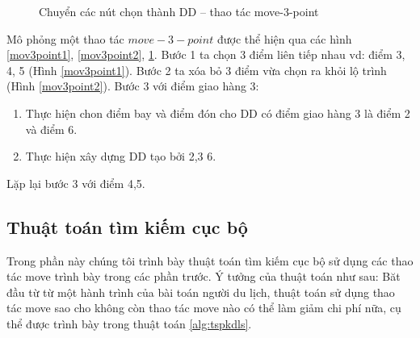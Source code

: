 \documentclass[a4paper,12pt]{report}
\begin{document}
\begin{figure}[H]

\caption{Chuyển các nút chọn thành DD -- thao tác move-3-point}\label{mov3point3}
\end{figure}

Mô phỏng một thao tác $move-3-point$ được thể hiện qua các hình \ref{mov3point1}, \ref{mov3point2}, \ref{mov3point3}. Bước 1 ta chọn 3 điểm liên tiếp nhau vd:  điểm 3, 4, 5 (Hình \ref{mov3point1}). Bước 2 ta xóa bỏ 3 điểm vừa chọn ra khỏi lộ trình (Hình \ref{mov3point2}). Bước 3 với điểm giao hàng 3:\begin{enumerate}
\item Thực hiện chon điểm bay và điểm đón cho DD có điểm giao hàng 3 là điểm 2 và điểm 6.
\item Thực hiện xây dựng DD tạo bởi 2,3 6.
\end{enumerate} 
Lặp lại bước 3 với điểm 4,5.
\subsection{Thuật toán tìm kiếm cục bộ}
\label{subsection:tspkdal}
Trong phần này chúng tôi trình bày thuật toán tìm kiếm cục bộ sử dụng các thao tác move trình bày trong các phần trước. Ý tưởng của thuật toán như sau: Băt đầu từ từ một hành trình của bài toán người du lịch, thuật toán sử dụng thao tác move sao cho không còn thao tác move nào có thể làm giảm chi phí nữa, cụ thể được trình bày trong thuật toán \ref{alg:tspkdls}.
\end{document}
